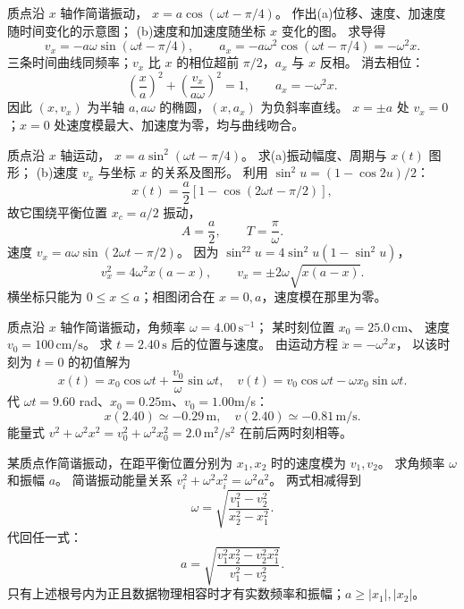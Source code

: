
质点沿 $x$ 轴作简谐振动，
$x=a\cos(\omega t-\pi/4)$。
作出(a)位移、速度、加速度随时间变化的示意图；
(b)速度和加速度随坐标 $x$ 变化的图。
\exsolution
求导得
\[
v_x=-a\omega\sin(\omega t-\pi/4),\qquad
a_x=-a\omega^2\cos(\omega t-\pi/4)=-\omega^2x.
\]
三条时间曲线同频率；$v_x$ 比 $x$ 的相位超前 $\pi/2$，$a_x$ 与 $x$ 反相。
消去相位：
\[
\boxed{\left(\frac{x}{a}\right)^2+
\left(\frac{v_x}{a\omega}\right)^2=1},
\qquad
\boxed{a_x=-\omega^2x}.
\]
因此 $(x,v_x)$ 为半轴 $a,a\omega$ 的椭圆，$(x,a_x)$ 为负斜率直线。
\excheck $x=\pm a$ 处 $v_x=0$；$x=0$ 处速度模最大、加速度为零，均与曲线吻合。

质点沿 $x$ 轴运动，
$x=a\sin^2(\omega t-\pi/4)$。
求(a)振动幅度、周期与 $x(t)$ 图形；
(b)速度 $v_x$ 与坐标 $x$ 的关系及图形。
\exsolution
利用 $\sin^2u=(1-\cos2u)/2$：
\[
x(t)=\frac a2\left[1-\cos(2\omega t-\pi/2)\right],
\]
故它围绕平衡位置 $x_c=a/2$ 振动，
\[
\boxed{A=\frac a2,\qquad T=\frac\pi\omega}.
\]
速度
$v_x=a\omega\sin(2\omega t-\pi/2)$。
因为
$\sin^22u=4\sin^2u(1-\sin^2u)$，
\[
\boxed{v_x^2=4\omega^2x(a-x)},\qquad
\boxed{v_x=\pm2\omega\sqrt{x(a-x)}}.
\]
\excheck 横坐标只能为 $0\le x\le a$；相图闭合在 $x=0,a$，速度模在那里为零。

质点沿 $x$ 轴作简谐振动，角频率
$\omega=4.00\,\mathrm{s^{-1}}$；
某时刻位置 $x_0=25.0\,\mathrm{cm}$、
速度 $v_0=100\,\mathrm{cm/s}$。
求 $t=2.40\,\mathrm s$ 后的位置与速度。
\exsolution
由运动方程 $\ddot x=-\omega^2x$，
以该时刻为 $t=0$ 的初值解为
\[
x(t)=x_0\cos\omega t+\frac{v_0}{\omega}\sin\omega t,
\quad
v(t)=v_0\cos\omega t-\omega x_0\sin\omega t.
\]
代 $\omega t=9.60$ rad、$x_0=0.25$m、$v_0=1.00$m/s：
\[
\boxed{x(2.40)\simeq-0.29\,\mathrm m},\quad
\boxed{v(2.40)\simeq-0.81\,\mathrm{m/s}}.
\]
\excheck 能量式
$v^2+\omega^2x^2=v_0^2+\omega^2x_0^2=2.0\,\mathrm{m^2/s^2}$
在前后两时刻相等。

某质点作简谐振动，在距平衡位置分别为
$x_1,x_2$ 时的速度模为 $v_1,v_2$。
求角频率 $\omega$ 和振幅 $a$。
\exsolution
简谐振动能量关系
$v_i^2+\omega^2x_i^2=\omega^2a^2$。
两式相减得到
\[
\boxed{\omega=
\sqrt{\frac{v_1^2-v_2^2}{x_2^2-x_1^2}}}.
\]
代回任一式：
\[
\boxed{a=
\sqrt{\frac{v_1^2x_2^2-v_2^2x_1^2}
{v_1^2-v_2^2}}}.
\]
\excheck 只有上述根号内为正且数据物理相容时才有实数频率和振幅；$a\ge|x_1|,|x_2|$。

